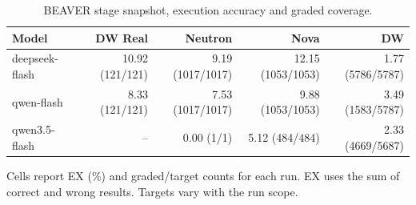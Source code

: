 \begin{table}[t]
\centering
\caption{BEAVER stage snapshot, execution accuracy and graded coverage.}
\begin{tabular}{lrrrr}
\toprule
Model & DW Real & Neutron & Nova & DW \\
\midrule
deepseek-flash & 10.92 (121/121) & 9.19 (1017/1017) & 12.15 (1053/1053) & 1.77 (5786/5787) \\
qwen-flash & 8.33 (121/121) & 7.53 (1017/1017) & 9.88 (1053/1053) & 3.49 (1583/5787) \\
qwen3.5-flash & -- & 0.00 (1/1) & 5.12 (484/484) & 2.33 (4669/5687) \\
\bottomrule
\end{tabular}
\par\smallskip
{\footnotesize Cells report EX (\%) and graded/target counts for each run. EX uses the sum of correct and wrong results. Targets vary with the run scope.\par}
\end{table}
